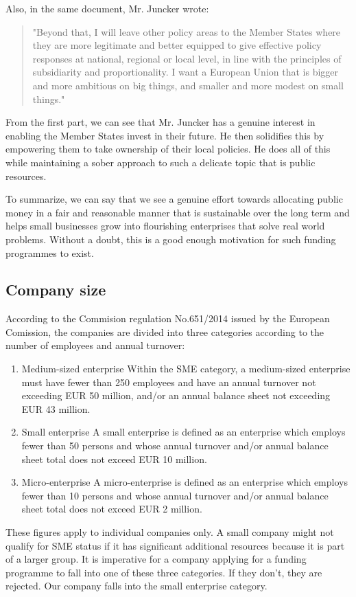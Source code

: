 \documentclass[12pt,oneside]{fithesis2}
\begin{document}
    \newline\newline
    Also, in the same document, Mr. Juncker wrote: \blockquote{"Beyond that, I will leave other policy areas to the Member States where they are more legitimate and better equipped to give effective policy responses at national, regional or local level, in line with the principles of subsidiarity and proportionality. I want a European Union that is bigger and more ambitious on big things, and smaller and more modest on small things."\cite{juncker-political-guidelines}}
    From the first part, we can see that Mr. Juncker has a genuine interest in enabling the Member States invest in their future. He then solidifies this by empowering them to take ownership of their local policies. He does all of this while maintaining a sober approach to such a delicate topic that is public resources.
    
    To summarize, we can say that we see a genuine effort towards allocating public money in a fair and reasonable manner that is sustainable over the long term and helps small businesses grow into flourishing enterprises that solve real world problems. Without a doubt, this is a good enough motivation for such funding programmes to exist.
    \subsection{Company size}
    \noindent
    According to the Commision regulation No.651/2014 \cite[page~70]{eu-commision-regulation} issued by the European Comission, the companies are divided into three categories according to the number of employees and annual turnover:
    \begin{enumerate}
        \item Medium-sized enterprise
        \newline\newline
        Within the SME category, a medium-sized enterprise must have fewer than 250 employees and have an annual turnover not exceeding EUR 50 million, and/or an annual balance sheet not exceeding EUR 43 million.
        \item Small enterprise
        \newline\newline
        A small enterprise is defined as an enterprise which employs fewer than 50 persons and whose annual turnover and/or annual balance sheet total does not exceed EUR 10 million.
        \item Micro-enterprise
        \newline\newline
        A micro-enterprise is defined as an enterprise which employs fewer than 10 persons and whose annual turnover and/or annual balance sheet total does not exceed EUR 2 million.
    \end{enumerate}
    These figures apply to individual companies only. A small company might not qualify for SME status if it has significant additional resources because it is part of a larger group. \cite{eu-commision-regulation}
    It is imperative for a company applying for a funding programme to fall into one of these three categories. If they don't, they are rejected. Our company falls into the small enterprise category.
\end{document}
